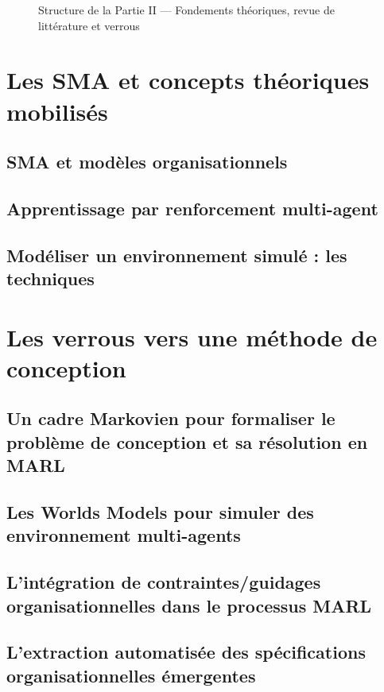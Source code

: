 \documentclass[ twoside,openright,titlepage,numbers=noenddot,headinclude,%
                footinclude=true,cleardoublepage=empty,abstractoff, %
                BCOR=5mm,paper=a4,fontsize=11pt,%
                french,american,%
                ]{scrreprt}
\begin{document}
\begin{figure}[h!]
    \centering
    
    \caption{Structure de la Partie II — Fondements théoriques, revue de littérature et verrous}
\end{figure}

\chapter{Les SMA et concepts théoriques mobilisés}

\section{SMA et modèles organisationnels}

\section{Apprentissage par renforcement multi-agent}

\section{Modéliser un environnement simulé : les techniques }

\chapter{Les verrous vers une méthode de conception}

\section{Un cadre Markovien pour formaliser le problème de conception et sa résolution en MARL}
\section{Les Worlds Models pour simuler des environnement multi-agents}
\section{L'intégration de contraintes/guidages organisationnelles dans le processus MARL}
\section{L'extraction automatisée des spécifications organisationnelles émergentes}
\end{document}
